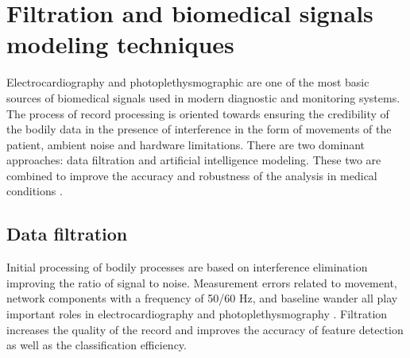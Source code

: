 \documentclass[journal]{IEEEtran}
\begin{document}
\newpage
\section{Filtration and biomedical signals modeling techniques}
Electrocardiography and photoplethysmographic are one of the most basic sources of biomedical signals used in modern diagnostic and monitoring systems. The process of record processing is oriented towards ensuring the credibility of the bodily data in the presence of interference in the form of movements of the patient, ambient noise and hardware limitations. There are two dominant approaches: data filtration and artificial intelligence modeling. These two are combined to improve the accuracy and robustness of the analysis in medical conditions \cite{1}.

\subsection{Data filtration}
Initial processing of bodily processes are based on interference elimination improving the ratio of signal to noise. Measurement errors related to movement, network components with a frequency of 50/60 Hz, and baseline wander all play important roles in electrocardiography and photoplethysmography \cite{2}. Filtration increases the quality of the record and improves the accuracy of feature detection as well as the classification efficiency.
\end{document}
